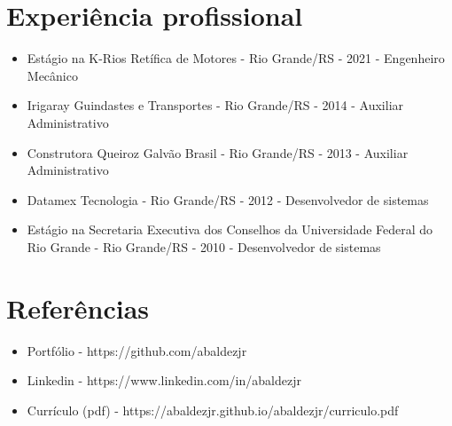 \documentclass[11pt,oneside,a4paper]{article}
\begin{document}
    \section*{Experiência profissional}
    \begin{itemize}
        \item Estágio na K-Rios Retífica de Motores - Rio Grande/RS - 2021 - Engenheiro Mecânico
        \item Irigaray Guindastes e Transportes - Rio Grande/RS - 2014 - Auxiliar Administrativo
        \item Construtora Queiroz Galvão Brasil - Rio Grande/RS - 2013 - Auxiliar Administrativo
        \item Datamex Tecnologia - Rio Grande/RS - 2012 - Desenvolvedor de sistemas
        \item Estágio na Secretaria Executiva dos Conselhos da Universidade Federal do Rio Grande - Rio Grande/RS - 2010 - Desenvolvedor de sistemas
    \end{itemize}
    \section*{Referências}
    \begin{itemize}
        \item Portfólio - https://github.com/abaldezjr
        \item Linkedin - https://www.linkedin.com/in/abaldezjr
        \item Currículo (pdf) - https://abaldezjr.github.io/abaldezjr/curriculo.pdf
    \end{itemize}
\end{document}
